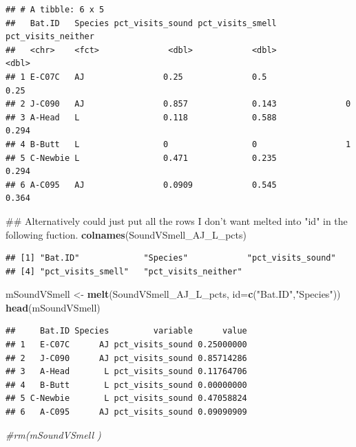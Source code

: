 \documentclass[]{article}
\newenvironment{Shaded}{\begin{snugshade}}{\end{snugshade}}
\newcommand{\KeywordTok}[1]{\textcolor[rgb]{0.13,0.29,0.53}{\textbf{{#1}}}}
\newcommand{\DataTypeTok}[1]{\textcolor[rgb]{0.13,0.29,0.53}{{#1}}}
\newcommand{\StringTok}[1]{\textcolor[rgb]{0.31,0.60,0.02}{{#1}}}
\newcommand{\CommentTok}[1]{\textcolor[rgb]{0.56,0.35,0.01}{\textit{{#1}}}}
\newcommand{\NormalTok}[1]{{#1}}
\begin{document}
\begin{verbatim}
## # A tibble: 6 x 5
##   Bat.ID   Species pct_visits_sound pct_visits_smell pct_visits_neither
##   <chr>    <fct>              <dbl>            <dbl>              <dbl>
## 1 E-C07C   AJ                0.25              0.5                0.25 
## 2 J-C090   AJ                0.857             0.143              0    
## 3 A-Head   L                 0.118             0.588              0.294
## 4 B-Butt   L                 0                 0                  1    
## 5 C-Newbie L                 0.471             0.235              0.294
## 6 A-C095   AJ                0.0909            0.545              0.364
\end{verbatim}

\begin{Shaded}
\begin{Highlighting}[]
\NormalTok{## Alternatively could just put all the rows I don't want melted into "id" in the following fuction. }
\KeywordTok{colnames}\NormalTok{(SoundVSmell_AJ_L_pcts)}
\end{Highlighting}
\end{Shaded}

\begin{verbatim}
## [1] "Bat.ID"             "Species"            "pct_visits_sound"  
## [4] "pct_visits_smell"   "pct_visits_neither"
\end{verbatim}

\begin{Shaded}
\begin{Highlighting}[]
\NormalTok{mSoundVSmell <-}\StringTok{ }\KeywordTok{melt}\NormalTok{(SoundVSmell_AJ_L_pcts, }\DataTypeTok{id=}\KeywordTok{c}\NormalTok{(}\StringTok{"Bat.ID"}\NormalTok{,}\StringTok{"Species"}\NormalTok{))}
\KeywordTok{head}\NormalTok{(mSoundVSmell)}
\end{Highlighting}
\end{Shaded}

\begin{verbatim}
##     Bat.ID Species         variable      value
## 1   E-C07C      AJ pct_visits_sound 0.25000000
## 2   J-C090      AJ pct_visits_sound 0.85714286
## 3   A-Head       L pct_visits_sound 0.11764706
## 4   B-Butt       L pct_visits_sound 0.00000000
## 5 C-Newbie       L pct_visits_sound 0.47058824
## 6   A-C095      AJ pct_visits_sound 0.09090909
\end{verbatim}

\begin{Shaded}
\begin{Highlighting}[]
\CommentTok{#rm(mSoundVSmell )}
\end{Highlighting}
\end{Shaded}
\end{document}
